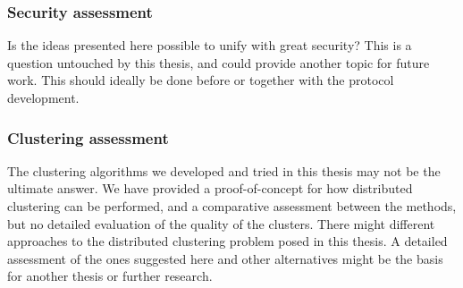 \subsubsection{Security assessment}
Is the ideas presented here possible to unify with great security? This is a question untouched by this thesis, and could provide another topic for future work. This should ideally
be done before or together with the protocol development. 

\subsubsection{Clustering assessment}
The clustering algorithms we developed and tried in this thesis may not be the ultimate answer. We have provided a proof-of-concept for how distributed clustering can be performed, and 
a comparative assessment between the methods, but no detailed evaluation of the quality of the clusters. There might different approaches to the distributed clustering problem 
posed in this thesis. A detailed assessment of the ones suggested here and other alternatives might be the basis for another thesis or further research.



